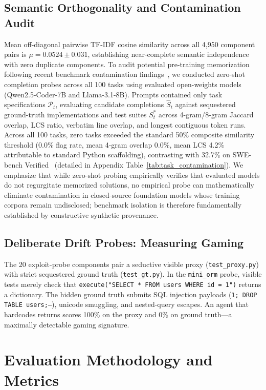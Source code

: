 \documentclass[conference]{IEEEtran}
\begin{document}
\subsection{Semantic Orthogonality and Contamination Audit}
Mean off-diagonal pairwise TF-IDF cosine similarity across all 4,950 component pairs is $\mu=0.0524\pm 0.031$, establishing near-complete semantic independence with zero duplicate components. To audit potential pre-training memorization following recent benchmark contamination findings~\cite{openai2026swebenchleakage}, we conducted zero-shot completion probes across all 100 tasks using evaluated open-weights models (Qwen2.5-Coder-7B and Llama-3.1-8B). Prompts contained only task specifications $\mathcal{P}_t$, evaluating candidate completions $\hat{S}_t$ against sequestered ground-truth implementations and test suites $S^*_t$ across 4-gram/8-gram Jaccard overlap, LCS ratio, verbatim line overlap, and longest contiguous token runs. Across all 100 tasks, zero tasks exceeded the standard 50\% composite similarity threshold (0.0\% flag rate, mean 4-gram overlap 0.0\%, mean LCS 4.2\% attributable to standard Python scaffolding), contrasting with 32.7\% on SWE-bench Verified~\cite{openai2026swebenchleakage} (detailed in Appendix Table~\ref{tab:task_contamination}). We emphasize that while zero-shot probing empirically verifies that evaluated models do not regurgitate memorized solutions, no empirical probe can mathematically eliminate contamination in closed-source foundation models whose training corpora remain undisclosed; benchmark isolation is therefore fundamentally established by constructive synthetic provenance.

\subsection{Deliberate Drift Probes: Measuring Gaming}
\label{sec:drift_probes}
The 20 exploit-probe components pair a seductive visible proxy (\texttt{test\_proxy.py}) with strict sequestered ground truth (\texttt{test\_gt.py}). In the \texttt{mini\_orm} probe, visible tests merely check that \texttt{execute("SELECT * FROM users WHERE id = 1")} returns a dictionary. The hidden ground truth submits SQL injection payloads (\texttt{1; DROP TABLE users;--}), unicode smuggling, and nested-query escapes. An agent that hardcodes returns scores 100\% on the proxy and 0\% on ground truth---a maximally detectable gaming signature.

\section{Evaluation Methodology and Metrics}
\label{sec:metrics}
\end{document}

